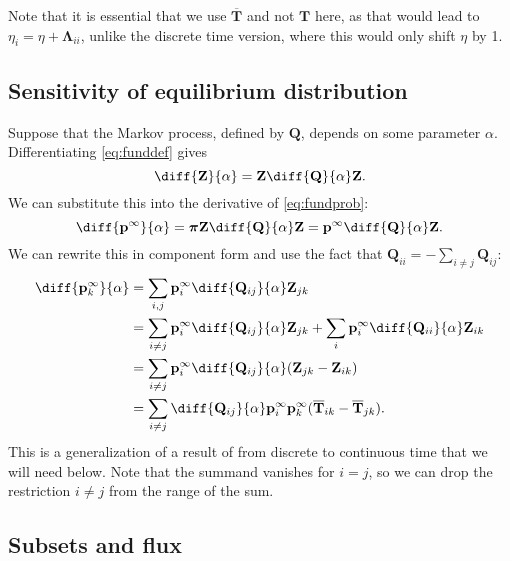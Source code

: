 \documentclass{article} %
\newcommand{\MM}{\mathbf{Q}}
\newcommand{\pr}{\mathbf{p}}
\newcommand{\eq}{\pr^\infty}
\newcommand{\fpt}{\mathbf{T}}
\newcommand{\fptb}{\overline{\fpt}}
\newcommand{\fund}{\mathbf{Z}}
\newcommand{\pib}{\boldsymbol{\pi}}
\newcommand{\Lb}{\boldsymbol{\Lambda}}
\begin{document}
Note that it is essential that we use $\fptb$ and not $\fpt$ here, as that would lead to $\eta_i=\eta+\Lb_{ii}$, unlike the discrete time version, where this would only shift $\eta$ by 1.

\subsection{Sensitivity of equilibrium distribution}\label{sec:sensitivity}

Suppose that the Markov process, defined by $\MM$, depends on some parameter $\alpha$.
Differentiating \eqref{eq:funddef} gives
%
\begin{equation}\label{eq:diffZ}
  \diff{\fund}{\alpha} = \fund \diff{\MM}{\alpha} \fund.
\end{equation}
%
We can substitute this into the derivative of \eqref{eq:fundprob}:
%
\begin{equation}\label{eq:diffp}
  \diff{\eq}{\alpha} = \pib \fund \diff{\MM}{\alpha} \fund = \eq \diff{\MM}{\alpha} \fund.
\end{equation}
%
We can rewrite this in component form and use the fact that $\MM_{ii} = - \sum_{i\neq j} \MM_{ij}$:
%
\begin{equation}\label{eq:diffpT}
\begin{aligned}
  \diff{\eq_k}{\alpha} &= \sum_{i,j} \eq_i \diff{\MM_{ij}}{\alpha} \fund_{jk} \\
    &= \sum_{i\neq j} \eq_i \diff{\MM_{ij}}{\alpha} \fund_{jk} + \sum_i \eq_i \diff{\MM_{ii}}{\alpha} \fund_{ik} \\
    &= \sum_{i\neq j} \eq_i \diff{\MM_{ij}}{\alpha} (\fund_{jk} - \fund_{ik}) \\
    &= \sum_{i\neq j} \diff{\MM_{ij}}{\alpha} \eq_i \eq_k (\fptb_{ik} - \fptb_{jk}).
\end{aligned}
\end{equation}
%
This is a generalization of a result of \cite{cho2000markov} from discrete to continuous time that we will need below.
Note that the summand vanishes for $i=j$, so we can drop the restriction $i\neq j$ from the range of the sum.

\subsection{Subsets and flux}\label{sec:subsets}
\end{document}
